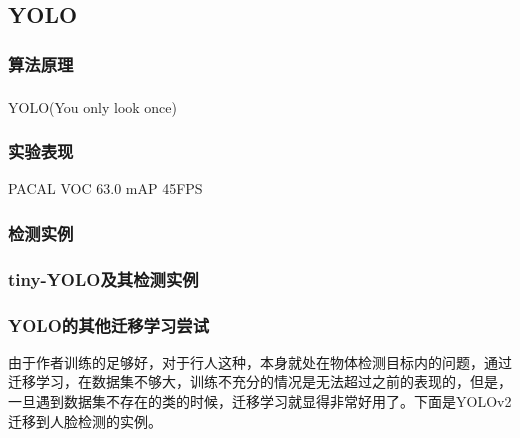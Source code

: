 \documentclass[12pt,a4paper,titlepage]{article}
\newcommand{\upcite}[1]{\textsuperscript{\textsuperscript{\cite{#1}}}}  %
\begin{document}
\subsection{YOLO}
\subsubsection{算法原理}
YOLO(You only look once)\upcite{redmon2016you}
\subsubsection{实验表现}
PACAL VOC 63.0 mAP    45FPS
\subsubsection{检测实例}

\subsubsection{tiny-YOLO及其检测实例}

\subsubsection{YOLO的其他迁移学习尝试}
由于作者训练的足够好，对于行人这种，本身就处在物体检测目标内的问题，通过迁移学习，在数据集不够大，训练不充分的情况是无法超过之前的表现的，但是，一旦遇到数据集不存在的类的时候，迁移学习就显得非常好用了。下面是YOLOv2迁移到人脸检测的实例。
\end{document}
